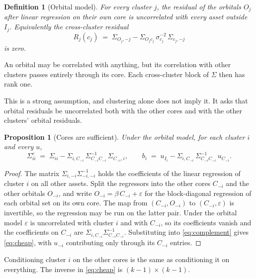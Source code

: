 \documentclass[11pt]{article}
\newtheorem{proposition}{Proposition}
\newtheorem{definition}{Definition}
\begin{document}
\begin{definition}[Orbital model]
For every cluster $j$, the residual of the orbitals $O_j$ after linear
regression on their own core is uncorrelated with every asset outside
$I_j$. Equivalently the cross-cluster residual
\begin{equation}
  R_j(c_j) \;=\; \Sigma_{O_j,-j}-\Sigma_{O_j c_j}\,\sigma_{c_j}^{-2}\,\Sigma_{c_j,-j}
  \label{eq:residual}
\end{equation}
is zero.
\end{definition}

An orbital may be correlated with anything, but its correlation with other
clusters passes entirely through its core. Each cross-cluster block of
$\Sigma$ then has rank one.

This is a strong assumption, and clustering alone does not imply it. It
asks that orbital residuals be uncorrelated both with the other cores and
with the other clusters' orbital residuals.

\begin{proposition}[Cores are sufficient]
\label{prop:sufficient}
Under the orbital model, for each cluster $i$ and every $u$,
\begin{equation}
  \Sigma^{c}_{ii}
  \;=\; \Sigma_{ii}-\Sigma_{i,C_{-i}}\,\Sigma_{C_{-i}C_{-i}}^{-1}\,\Sigma_{C_{-i},i},
  \qquad
  b_i \;=\; u_{I_i}-\Sigma_{i,C_{-i}}\,\Sigma_{C_{-i}C_{-i}}^{-1}\,u_{C_{-i}} .
  \label{eq:cheap}
\end{equation}
\end{proposition}

\begin{proof}
The matrix $\Sigma_{i,-i}\Sigma_{-i,-i}^{-1}$ holds the coefficients of the
linear regression of cluster $i$ on all other assets. Split the regressors
into the other cores $C_{-i}$ and the other orbitals $O_{-i}$, and write
$O_{-i}=\beta\,C_{-i}+\varepsilon$ for the block-diagonal regression of
each orbital set on its own core. The map from $(C_{-i},O_{-i})$ to
$(C_{-i},\varepsilon)$ is invertible, so the regression may be run on the
latter pair. Under the orbital model $\varepsilon$ is uncorrelated with
cluster $i$ and with $C_{-i}$, so its coefficients vanish and the
coefficients on $C_{-i}$ are $\Sigma_{i,C_{-i}}\Sigma_{C_{-i}C_{-i}}^{-1}$.
Substituting into \eqref{eq:complement} gives \eqref{eq:cheap}, with
$u_{-i}$ contributing only through its $C_{-i}$ entries.
\end{proof}

Conditioning cluster $i$ on the other cores is the same as conditioning it
on everything. The inverse in \eqref{eq:cheap} is $(k-1)\times(k-1)$.
\end{document}
